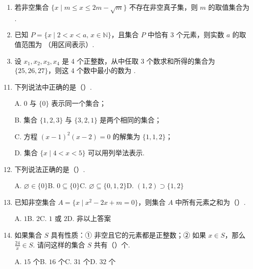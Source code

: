 \documentclass[a4paper,11pt]{article}
\begin{document}
\begin{enumerate}

\item 若非空集合 $\{x\mid m\leqslant x\leqslant 2m-\sqrt{m}\}$ 不存在非空真子集，则 $m$ 的取值集合为 \blankline[2em].


\item 已知 $P=\{x\mid 2<x<a,\,x\in\mathbb{N}\}$，且集合 $P$ 中恰有 3 个元素，则实数 $a$ 的取值范围为 \blankline[3em]（用区间表示）.

\ans{$(5,6]$}

\item 设 $x_1,x_2,x_3,x_4$ 是 4 个正整数，从中任取 3 个数求和所得的集合为 $\{25,26,27\}$，则这 4 个数中最小的数为 \blankline[2em].


\ifanswer
\solbegin
{}
\solend

\fi
\end{enumerate}


\begin{enumerate}
\setcounter{enumi}{10}

\item 下列说法中正确的是\mbox{（\quad）.}

\keepwithprev
A. $0$ 与 $\{0\}$ 表示同一个集合；

B. 集合 $\{1,2,3\}$ 与 $\{3,2,1\}$ 是两个相同的集合；

C. 方程 $(x-1)^2(x-2)=0$ 的解集为 $\{1,1,2\}$；

D. 集合 $\{x\mid 4<x<5\}$ 可以用列举法表示.


\item 下列说法正确的是\mbox{（\quad）.}

\keepwithprev
A. $\varnothing\in\{0\}$\qquad B. $0\subseteq\{0\}$\qquad C. $\varnothing\subseteq\{0,1,2\}$\qquad D. $(1,2)\supset\{1,2\}$


\item 已知非空集合 $A=\{x\mid x^2-2x+m=0\}$，则集合 $A$ 中所有元素之和为\mbox{（\quad）.}

\keepwithprev
A. $1$\qquad B. $2$\qquad C. $1$ 或 $2$\qquad D. 非以上答案


\item 如果集合 $S$ 具有性质：① 非空且它的元素都是正整数；② 如果 $x\in S$，那么 $\tfrac{24}{x}\in S$. 请问这样的集合 $S$ 共有\mbox{（\quad）}个.

\keepwithprev
A. $15$ 个\qquad B. $16$ 个\qquad C. $31$ 个\qquad D. $32$ 个


\end{enumerate}
\end{document}
